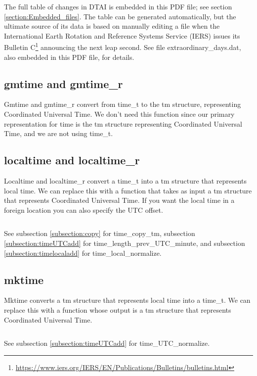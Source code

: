 \documentclass[letterpaper,twoside]{article}
\newcommand{\filename}{\ttfamily\smaller}
\begin{document}
The full table of changes in DTAI is embedded in this PDF file;
see section \ref{section:Embedded_files}.
The table can be generated automatically\citep{JBS_001}, but the ultimate
source of its data is based on manually editing a file when the
International Earth Rotation and Reference Systems Service (IERS)
issues its Bulletin
C\footnote{\href{https://www.iers.org/IERS/EN/Publications/Bulletins/bulletins.html}{https://www.iers.org/IERS/EN/Publications/Bulletins/bulletins.html}}
announcing the next leap second.  See file
{\filename extraordinary\_days.dat}, also embedded in this PDF file,
for details.

\subsection{gmtime and gmtime\_r}
Gmtime and gmtime\_r convert from {\ttfamily time\_t} to
the {\ttfamily tm} structure,
representing Coordinated Universal Time.  We don't
need this function since our primary representation for time is the
{\ttfamily tm} structure representing Coordinated Universal Time,
and we are not using {\ttfamily time\_t}.

\subsection{localtime and localtime\_r}
\label{subsection:localtime}
Localtime and localtime\_r convert a {\ttfamily time\_t} into
a {\ttfamily tm} structure that
represents local time.  We can replace this with a function that takes
as input a {\ttfamily tm} structure that represents Coordinated Universal Time.
If you want the local time in a foreign location you can also specify
the UTC offset.
\inputminted[firstline=32]{c}{src/time_utc_to_local.c}
See subsection \ref{subsection:copy} for time\_copy\_tm,
subsection \ref{subsection:timeUTCadd} for
time\_\-length\_\-prev\_\-UTC\_\-minute,
and subsection \ref{subsection:timelocaladd} for time\_local\_normalize.

\subsection{mktime}
\label{subsection:mktime}
Mktime converts a {\ttfamily tm} structure that represents local time into a
{\ttfamily time\_t}.  We can replace this with a function whose output is a
{\ttfamily tm} structure that represents Coordinated Universal Time.
\inputminted[firstline=32]{c}{src/time_local_to_utc.c}
See subsection \ref{subsection:timeUTCadd} for time\_UTC\_normalize.
\end{document}
